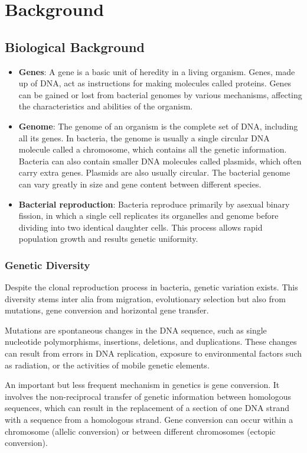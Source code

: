 \chapter{Background}\label{kap:background}
\section{Biological Background}\label{sec:biological-background}
\begin{itemize}
      \item \textbf{Genes}: A gene is a basic unit of heredity in a living organism.
            Genes, made up of \ac{DNA}, act as instructions for making molecules called proteins.
            Genes can be gained or lost from bacterial genomes by various mechanisms, affecting the characteristics and abilities of the organism.
      \item \textbf{Genome}: The genome of an organism is the complete set of \ac{DNA}, including all its genes.
            In bacteria, the genome is usually a single circular \ac{DNA} molecule called a chromosome, which contains all the genetic information.
            Bacteria can also contain smaller \ac{DNA} molecules called plasmids, which often carry extra genes.
            Plasmids are also usually circular. The bacterial genome can vary greatly in size and gene content between different species.
      \item \textbf{Bacterial reproduction}: Bacteria reproduce primarily by asexual binary fission, in which a single cell replicates its organelles and genome before dividing into two identical daughter cells.
            This process allows rapid population growth and results genetic uniformity.
\end{itemize}
\subsection{Genetic Diversity}
Despite the clonal reproduction process in bacteria, genetic variation exists.
This diversity stems inter alia from migration, evolutionary selection but also from mutations, gene conversion and horizontal gene transfer.

Mutations are spontaneous changes in the \ac{DNA} sequence, such as single nucleotide polymorphisms, insertions, deletions, and duplications.
These changes can result from errors in \ac{DNA} replication, exposure to environmental factors such as radiation, or the activities of mobile genetic elements.

An important but less frequent mechanism in genetics is gene conversion.
It involves the non-reciprocal transfer of genetic information between homologous sequences, which can result in the replacement of a section of one \ac{DNA} strand with a sequence from a homologous strand.
Gene conversion can occur within a chromosome (allelic conversion) or between different chromosomes (ectopic conversion).

